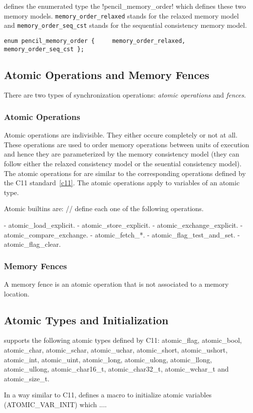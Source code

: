 \pencil defines the enumerated type the \lstlisting!pencil_memory_order!
which defines these two memory models.
\lstinline!memory_order_relaxed! stands for the relaxed memory model and
\lstinline!memory_order_seq_cst! stands for the sequential consistency memory
model.

\lstinline!enum pencil_memory_order {
    memory_order_relaxed,
    memory_order_seq_cst
};!

\subsection{Atomic Operations and Memory Fences}

There are two types of synchronization operations: \emph{atomic operations} and
\emph{fences}.

\subsubsection{Atomic Operations}
Atomic operations are indivisible. They either occure completely or not at all.
These operations are used to order memory operations between units of execution
and hence they are parameterized by the \pencil memory consistency model
(they can follow either the relaxed consistency model or the seuential
consistency model).
The atomic operations for \pencil are similar to the corresponding operations
defined by the C11 standard~\ref{c11}.
The \pencil atomic operations apply to variables of an atomic type.

Atomic builtins are:
// define each one of the following operations.

- atomic_load_explicit.
- atomic_store_explicit.
- atomic_exchange_explicit.
- atomic_compare_exchange.
- atomic_fetch_*.
- atomic_flag_test_and_set.
- atomic_flag_clear.


\subsubsection{Memory Fences}
A memory fence is an atomic operation that is not associated to a memory
location.


\subsection{Atomic Types and Initialization}
\pencil supports the following atomic types defined by C11: atomic_flag,
atomic_bool, atomic_char, atomic_schar, atomic_uchar, atomic_short,
atomic_ushort, atomic_int, atomic_uint, atomic_long, atomic_ulong, atomic_llong,
atomic_ullong, atomic_char16_t, atomic_char32_t, atomic_wchar_t and
atomic_size_t.

In a way similar to C11, \pencil defines a macro to initialize atomic variables
(ATOMIC_VAR_INIT) which ....

